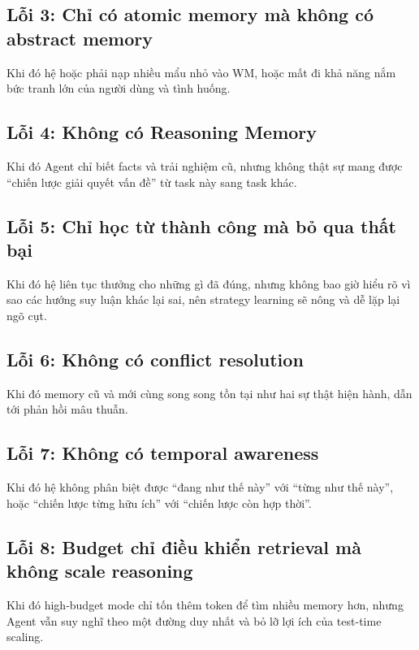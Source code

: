 \documentclass[a4paper,12pt]{article}
\begin{document}
\subsection*{Lỗi 3: Chỉ có atomic memory mà không có abstract memory}

Khi đó hệ hoặc phải nạp nhiều mẩu nhỏ vào WM, hoặc mất đi khả năng nắm bức tranh lớn của người dùng và tình huống.

\subsection*{Lỗi 4: Không có Reasoning Memory}

Khi đó Agent chỉ biết facts và trải nghiệm cũ, nhưng không thật sự mang được ``chiến lược giải quyết vấn đề'' từ task này sang task khác.

\subsection*{Lỗi 5: Chỉ học từ thành công mà bỏ qua thất bại}

Khi đó hệ liên tục thưởng cho những gì đã đúng, nhưng không bao giờ hiểu rõ vì sao các hướng suy luận khác lại sai, nên strategy learning sẽ nông và dễ lặp lại ngõ cụt.

\subsection*{Lỗi 6: Không có conflict resolution}

Khi đó memory cũ và mới cùng song song tồn tại như hai sự thật hiện hành, dẫn tới phản hồi mâu thuẫn.

\subsection*{Lỗi 7: Không có temporal awareness}

Khi đó hệ không phân biệt được ``đang như thế này'' với ``từng như thế này'', hoặc ``chiến lược từng hữu ích'' với ``chiến lược còn hợp thời''.

\subsection*{Lỗi 8: Budget chỉ điều khiển retrieval mà không scale reasoning}

Khi đó high-budget mode chỉ tốn thêm token để tìm nhiều memory hơn, nhưng Agent vẫn suy nghĩ theo một đường duy nhất và bỏ lỡ lợi ích của test-time scaling.
\end{document}
